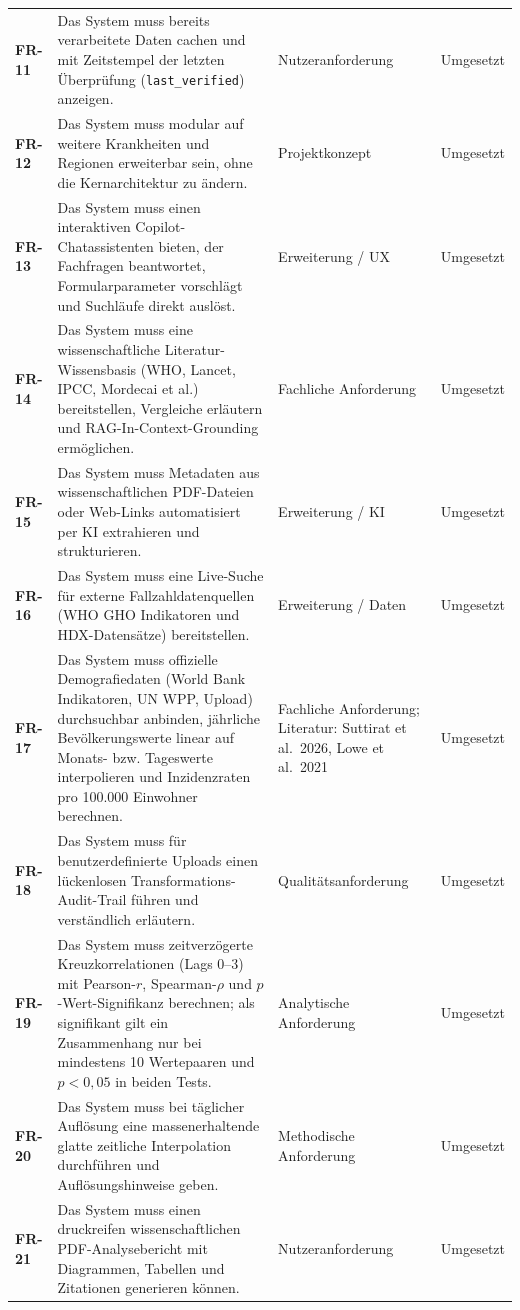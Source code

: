 \documentclass[11pt,a4paper]{article}
\begin{document}
\begin{longtable}{@{}>{\bfseries}p{1.6cm} L{7.4cm} L{3.6cm} L{2.4cm}@{}}
FR-11 & Das System muss bereits verarbeitete Daten cachen und mit Zeitstempel der letzten \"Uberpr\"ufung (\texttt{last\_verified}) anzeigen. & Nutzer\-anforderung & Umgesetzt \\
FR-12 & Das System muss modular auf weitere Krankheiten und Regionen erweiterbar sein, ohne die Kernarchitektur zu \"andern. & Projektkonzept & Umgesetzt \\
FR-13 & Das System muss einen interaktiven Copilot-Chatassistenten bieten, der Fachfragen beantwortet, Formularparameter vorschl\"agt und Suchl\"aufe direkt ausl\"ost. & Erweiterung / UX & Umgesetzt \\
FR-14 & Das System muss eine wissenschaftliche Literatur-Wissensbasis (WHO, Lancet, IPCC, Mordecai et al.) bereitstellen, Vergleiche erl\"autern und RAG-In-Context-Grounding erm\"oglichen. & Fachliche Anforderung & Umgesetzt \\
FR-15 & Das System muss Metadaten aus wissenschaftlichen PDF-Dateien oder Web-Links automatisiert per KI extrahieren und strukturieren. & Erweiterung / KI & Umgesetzt \\
FR-16 & Das System muss eine Live-Suche f\"ur externe Fallzahldatenquellen (WHO GHO Indikatoren und HDX-Datens\"atze) bereitstellen. & Erweiterung / Daten & Umgesetzt \\
FR-17 & Das System muss offizielle Demografiedaten (World Bank Indikatoren, UN WPP, Upload) durchsuchbar anbinden, j\"ahrliche Bev\"olkerungswerte linear auf Monats- bzw. Tageswerte interpolieren und Inzidenzraten pro 100.000 Einwohner berechnen. & Fachliche Anforderung; Literatur: Suttirat et al.\ 2026, Lowe et al.\ 2021 & Umgesetzt \\
FR-18 & Das System muss f\"ur benutzerdefinierte Uploads einen l\"uckenlosen Transformations-Audit-Trail f\"uhren und verst\"andlich erl\"autern. & Qualit\"ats\-anforderung & Umgesetzt \\
FR-19 & Das System muss zeitverz\"ogerte Kreuzkorrelationen (Lags 0--3) mit Pearson-$r$, Spearman-$\rho$ und $p$-Wert-Signifikanz berechnen; als signifikant gilt ein Zusammenhang nur bei mindestens 10 Wertepaaren und $p < 0{,}05$ in beiden Tests. & Analytische Anforderung & Umgesetzt \\
FR-20 & Das System muss bei t\"aglicher Aufl\"osung eine massenerhaltende glatte zeitliche Interpolation durchf\"uhren und Aufl\"osungshinweise geben. & Methodische Anforderung & Umgesetzt \\
FR-21 & Das System muss einen druckreifen wissenschaftlichen PDF-Analysebericht mit Diagrammen, Tabellen und Zitationen generieren k\"onnen. & Nutzer\-anforderung & Umgesetzt \\

\end{longtable}
\end{document}
